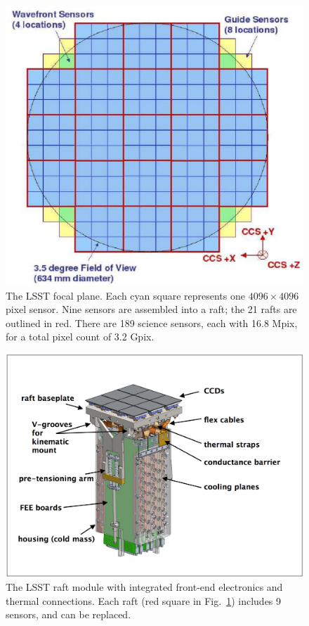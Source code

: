 \documentclass{emulateapj}
\begin{document}
\begin{figure}[ht]
\includegraphics[width=1.0\hsize,clip]{fov.pdf}
\caption{The LSST focal plane. Each cyan square represents one
$4096\times4096$ pixel sensor. Nine sensors are assembled into a
raft; the 21 rafts are outlined in red. There are 189 science sensors, each 
with 16.8 Mpix, for a total pixel count of 3.2 Gpix.} 
\label{Fig:fov}
\end{figure}

\begin{figure}[ht]
\includegraphics[width=1.\hsize,clip]{raft.png}
\caption{The LSST raft module with integrated front-end electronics
and thermal connections. Each raft (red square in Fig.~\ref{Fig:fov})
includes 9 sensors, and can be replaced.} 
\label{Fig:raft}
\end{figure}
\end{document}
